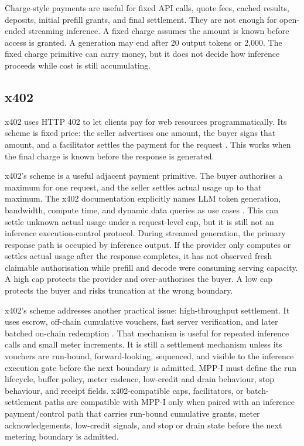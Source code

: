 \documentclass[11pt]{article}
\newcommand{\field}[1]{\texttt{\detokenize{#1}}}
\newcommand{\mppi}{MPP-I}
\begin{document}
Charge-style payments are useful for fixed API calls, quote fees, cached results, deposits, initial prefill grants, and final settlement. They are not enough for open-ended streaming inference. A fixed charge assumes the amount is known before access is granted. A generation may end after 20 output tokens or 2{,}000. The fixed charge primitive can carry money, but it does not decide how inference proceeds while cost is still accumulating.

\subsection{x402}

x402 uses HTTP 402 to let clients pay for web resources programmatically. Its \field{exact} scheme is fixed price: the seller advertises one amount, the buyer signs that amount, and a facilitator settles the payment for the request \cite{x402exact}. This works when the final charge is known before the response is generated.

x402's \field{upto} scheme is a useful adjacent payment primitive. The buyer authorises a maximum for one request, and the seller settles actual usage up to that maximum. The x402 documentation explicitly names LLM token generation, bandwidth, compute time, and dynamic data queries as use cases \cite{x402upto}. This can settle unknown actual usage under a request-level cap, but it is still not an inference execution-control protocol. During streamed generation, the primary response path is occupied by inference output. If the provider only computes or settles actual usage after the response completes, it has not observed fresh claimable authorisation while prefill and decode were consuming serving capacity. A high cap protects the provider and over-authorises the buyer. A low cap protects the buyer and risks truncation at the wrong boundary.

x402's \field{batch-settlement} scheme addresses another practical issue: high-throughput settlement. It uses escrow, off-chain cumulative vouchers, fast server verification, and later batched on-chain redemption \cite{x402batch}. That mechanism is useful for repeated inference calls and small meter increments. It is still a settlement mechanism unless its vouchers are run-bound, forward-looking, sequenced, and visible to the inference execution gate before the next boundary is admitted. \mppi{} must define the run lifecycle, buffer policy, meter cadence, low-credit and drain behaviour, stop behaviour, and receipt fields. x402-compatible caps, facilitators, or batch-settlement paths are compatible with \mppi{} only when paired with an inference payment/control path that carries run-bound cumulative grants, meter acknowledgements, low-credit signals, and stop or drain state before the next metering boundary is admitted.
\end{document}
